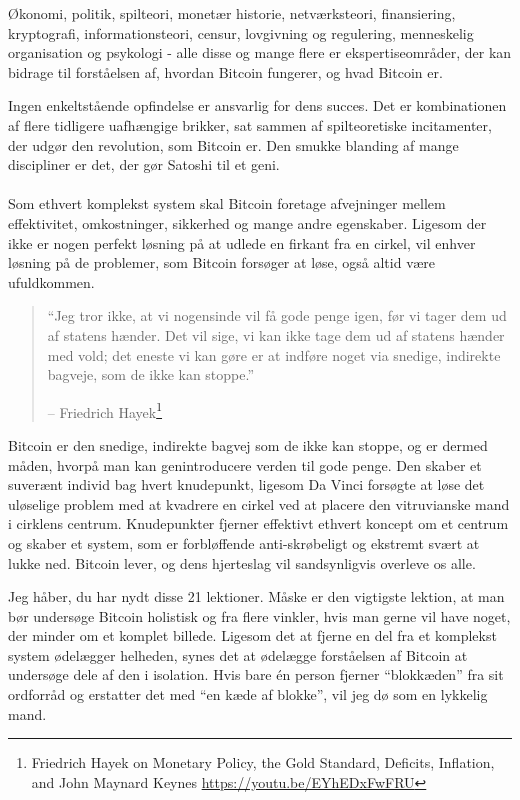 \documentclass[paper=6in:9in,pagesize=pdftex,headinclude=on,footinclude=on,12pt]{scrbook}
\begin{document}
Økonomi, politik, spilteori, monetær historie, netværksteori, finansiering, kryptografi, informationsteori, censur, lovgivning og regulering, menneskelig organisation og psykologi - alle disse og mange flere er ekspertiseområder, der kan bidrage til forståelsen af, hvordan Bitcoin fungerer, og hvad Bitcoin er.

Ingen enkeltstående opfindelse er ansvarlig for dens succes. Det er kombinationen af flere tidligere uafhængige brikker, sat sammen af spilteoretiske incitamenter, der udgør den revolution, som Bitcoin er. Den smukke blanding af mange discipliner er det, der gør Satoshi til et geni.\paragraph{} Som ethvert komplekst system skal Bitcoin foretage afvejninger mellem effektivitet, omkostninger, sikkerhed og mange andre egenskaber. Ligesom der ikke er nogen perfekt løsning på at udlede en firkant fra en cirkel, vil enhver løsning på de problemer, som Bitcoin forsøger at løse, også altid være ufuldkommen.\begin{quotation}\begin{samepage} \enquote{Jeg tror ikke, at vi nogensinde vil få gode penge igen, før vi tager dem ud af statens hænder. Det vil sige, vi kan ikke tage dem ud af statens hænder med vold; det eneste vi kan gøre er at indføre noget via snedige, indirekte bagveje, som de ikke kan stoppe.} \begin{flushright} -- Friedrich Hayek\footnote{Friedrich Hayek on Monetary Policy, the Gold Standard, Deficits, Inflation, and John Maynard Keynes \url{https://youtu.be/EYhEDxFwFRU}}
\end{flushright}\end{samepage}\end{quotation}

Bitcoin er den snedige, indirekte bagvej som de ikke kan stoppe, og er dermed måden, hvorpå man kan genintroducere verden til gode penge. Den skaber et suverænt individ bag hvert knudepunkt, ligesom Da Vinci forsøgte at løse det uløselige problem med at kvadrere en cirkel ved at placere den vitruvianske mand i cirklens centrum. Knudepunkter fjerner effektivt ethvert koncept om et centrum og skaber et system, som er forbløffende anti-skrøbeligt og ekstremt svært at lukke ned. Bitcoin lever, og dens hjerteslag vil sandsynligvis overleve os alle.

Jeg håber, du har nydt disse 21 lektioner. Måske er den vigtigste lektion, at man bør undersøge Bitcoin holistisk og fra flere vinkler, hvis man gerne vil have noget, der minder om et komplet billede. Ligesom det at fjerne en del fra et komplekst system ødelægger helheden, synes det at ødelægge forståelsen af Bitcoin at undersøge dele af den i isolation. Hvis bare \'en person fjerner \enquote{blokkæden} fra sit ordforråd og erstatter det med \enquote{en kæde af blokke}, vil jeg dø som en lykkelig mand.
\end{document}

